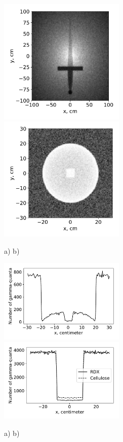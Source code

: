 \documentclass[a4paper]{panl}
\begin{document}
\begin{figure}[t]
    \begin{center}
        \includegraphics[width=60mm]{figures/Sword.pdf} 
        \includegraphics[width=60mm]{figures/UranCube1.pdf}  
        \vspace{-3mm}
        \caption{a) b)}
    \end{center}
    \vspace{-5mm}
\end{figure}
\begin{figure}[t]
    \begin{center}
        \includegraphics[width=60mm]{figures/UranCube2.pdf} 
        \includegraphics[width=60mm]{figures/Hex.pdf}  
        \vspace{-3mm}
        \caption{a) b)}
    \end{center}
    \vspace{-5mm}
\end{figure}
\end{document}
